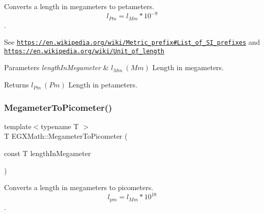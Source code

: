 Converts a length in megameters to petameters. \[ l_{Pm}=l_{Mm} * 10^{-9} \]. 

See \href{https://en.wikipedia.org/wiki/Metric_prefix#List_of_SI_prefixes}{\tt https\+://en.\+wikipedia.\+org/wiki/\+Metric\+\_\+prefix\#\+List\+\_\+of\+\_\+\+S\+I\+\_\+prefixes} and \href{https://en.wikipedia.org/wiki/Unit_of_length}{\tt https\+://en.\+wikipedia.\+org/wiki/\+Unit\+\_\+of\+\_\+length} 
\begin{DoxyParams}{Parameters}
{\em length\+In\+Megameter} & $ l_{Mm}\ (Mm)$ Length in megameters. \\
\hline
\end{DoxyParams}
\begin{DoxyReturn}{Returns}
$ l_{Pm}\ (Pm)$ Length in petameters. 
\end{DoxyReturn}
\mbox{\label{group___e_g_x_math-_conversions-_length_conversions-_s_i-_megameter-_s_i_ga0f6585bdcd16b6748b6c4d9116dd955c}} 
\subsubsection{\texorpdfstring{Megameter\+To\+Picometer()}{MegameterToPicometer()}}
{\footnotesize\ttfamily template$<$typename T $>$ \\
T E\+G\+X\+Math\+::\+Megameter\+To\+Picometer (\begin{DoxyParamCaption}\item[{const T}]{length\+In\+Megameter }\end{DoxyParamCaption})}



Converts a length in megameters to picometers. \[ l_{pm}=l_{Mm} * 10^{18} \]. 

